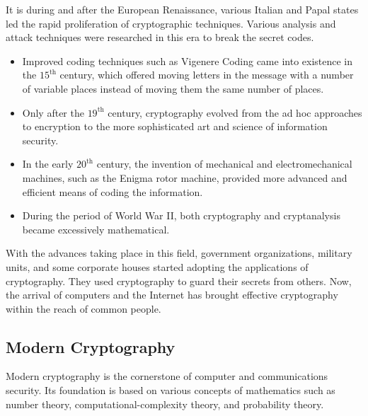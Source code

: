 \documentclass[british]{report}
\begin{document}
It is during and after the European Renaissance, various Italian and
Papal states led the rapid proliferation of cryptographic techniques.
Various analysis and attack techniques were researched in this era
to break the secret codes.
\begin{itemize}
	\item Improved coding techniques such as Vigenere Coding came into existence
	      in the $15^{\text{th}}$ century, which offered moving letters in
	      the message with a number of variable places instead of moving them
	      the same number of places.
	\item Only after the $19^{\text{th}}$ century, cryptography evolved from
	      the ad hoc approaches to encryption to the more sophisticated art
	      and science of information security.
	\item In the early $20^{\text{th}}$ century, the invention of mechanical
	      and electromechanical machines, such as the Enigma rotor machine,
	      provided more advanced and efficient means of coding the information.
	\item During the period of World War II, both cryptography and cryptanalysis
	      became excessively mathematical.
\end{itemize}
With the advances taking place in this field, government organizations,
military units, and some corporate houses started adopting the applications
of cryptography. They used cryptography to guard their secrets from
others. Now, the arrival of computers and the Internet has brought
effective cryptography within the reach of common people.

\subsection{Modern Cryptography}

Modern cryptography is the cornerstone of computer and communications
security. Its foundation is based on various concepts of mathematics
such as number theory, computational-complexity theory, and probability
theory.
\end{document}

